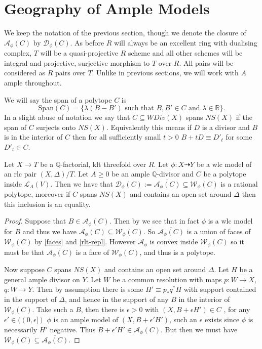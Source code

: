 \documentclass[a4paper,12pt]{amsart}
\begin{document}
	\section{Geography of Ample Models}
	
	We keep the notation of the previous section, though we denote the closure of $\mathcal{A}_{\phi}(C)$ by $\mathcal{D}_{\phi}(C)$. As before $R$ will always be an excellent ring with dualising complex, $T$ will be a quasi-projective $R$ scheme and all other schemes will be integral and projective, surjective morphism to $T$ over $R$. All pairs will be considered as $R$ pairs over $T$. Unlike in previous sections, we will work with $A$ ample throughout.
	
	We will say the span of a polytope $C$ is $$\text{Span}(C)=\{\lambda(B-B') \text{ such that } B, B' \in C \text{ and } \lambda \in \mathbb{R}\}.$$  In a slight abuse of notation we say that $C \subseteq WDiv(X)$ spans $NS(X)$ if the span of $C$ surjects onto $NS(X)$. Equivalently this means if $D$ is a divisor and $B$ is in the interior of $C$ then for all sufficiently small $t>0$ $B+tD\equiv D'_{t}$ for some $D'_{t}\in C$.
		
	\begin{lemma}\label{close}
		Let $X\to T$ be a $\mathbb{Q}$-factorial, klt threefold over $R$. Let $\phi:X \dashrightarrow Y$ be a wlc model of an rlc pair $(X,\Delta)/T$. Let $A \geq 0$ be an ample $\mathbb{Q}$-divisor and $C$ be a polytope inside $\mathcal{L}_{A}(V)$. Then we have that $\mathcal{D}_{\phi}(C):=\overline{\mathcal{A}_{\phi}(C)} \subseteq \mathcal{W}_{\phi}(C)$ is a rational polytope, moreover if $C$ spans $NS(X)$ and contains an open set around $\Delta$ then this inclusion is an equality.
	\end{lemma}
	
	\begin{proof}
		Suppose that $B \in \mathcal{A}_{\phi}(C)$. Then by \cite[Theorem 3.6.5]{birkar2010existence} we see that in fact $\phi$ is a wlc model for $B$ and thus we have $\mathcal{A}_{\phi}(C) \subseteq \mathcal{W}_{\phi}(C)$. So $\overline{\mathcal{A}_{\phi}(C)}$ is a union of faces of $\mathcal{W}_{\phi}(C)$ by \autoref{faces} and \autoref{rlt-repl}. However $\mathcal{A}_{\phi}$ is convex inside $\mathcal{W}_{\phi}(C)$ so it must be that $\overline{\mathcal{A}_{\phi}(C)}$ is a face of $\mathcal{W}_{\phi}(C)$, and thus is a polytope.
		
		Now suppose $C$ spans $NS(X)$ and contains an open set around $\Delta$.
		Let $H$ be a general ample divisor on $Y$. Let $W$ be a common resolution with maps $p:W \to X$, $q:W \to Y$. Then by assumption there is some $H' \equiv p_{*}q^{*}H$ with support contained in the support of $\Delta$, and hence in the support of any $B$ in the interior of $\mathcal{W}_{\phi}(C)$. Take such a $B$, then there is $\epsilon >0$ with $(X,B+\epsilon H') \in C$ , for any $\epsilon' \in ((0,\epsilon])$ $\phi$ is an ample model of $(X,B+ \epsilon' H')$, such an $\epsilon$ exists since $\phi$ is necessarily $H'$ negative. Thus $B+\epsilon' H' \in \mathcal{A}_{\phi}(C)$. But then we must have $\mathcal{W}_{\phi}(C)\subseteq \overline{\mathcal{A}_{\phi}(C)}$.
	\end{proof}
	
\end{document}
